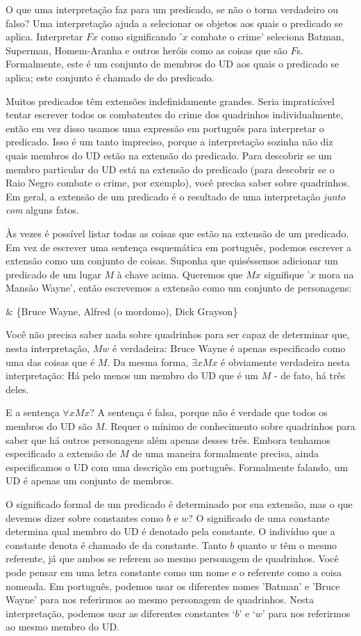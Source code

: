 O que uma interpretação faz para um predicado, se não o torna verdadeiro ou falso? Uma interpretação ajuda a selecionar os objetos aos quais o predicado se aplica. Interpretar $Fx$ como significando '$x$ combate o crime' seleciona Batman, Superman, Homem-Aranha e outros heróis como as coisas que são $F$s. Formalmente, este é um conjunto de membros do UD aos quais o predicado se aplica; este conjunto é chamado de  do predicado.

Muitos predicados têm extensões indefinidamente grandes. Seria impraticável tentar escrever todos os combatentes do crime dos quadrinhos individualmente, então em vez disso usamos uma expressão em português para interpretar o predicado. Isso é um tanto impreciso, porque a interpretação sozinha não diz quais membros do UD estão na extensão do predicado. Para descobrir se um membro particular do UD está na extensão do predicado (para descobrir se o Raio Negro combate o crime, por exemplo), você precisa saber sobre quadrinhos. Em geral, a extensão de um predicado é o resultado de uma interpretação \emph{junto com} alguns fatos.

Às vezes é possível listar todas as coisas que estão na extensão de um predicado. Em vez de escrever uma sentença esquemática em português, podemos escrever a extensão como um conjunto de coisas. Suponha que quiséssemos adicionar um predicado de um lugar $M$ à chave acima. Queremos que $Mx$ signifique '$x$ mora na Mansão Wayne', então escrevemos a extensão como um conjunto de personagens:
\begin{partialmodel}
	 & \{Bruce Wayne, Alfred (o mordomo), Dick Grayson\}
\end{partialmodel}
Você não precisa saber nada sobre quadrinhos para ser capaz de determinar que, nesta interpretação, $Mw$ é verdadeira: Bruce Wayne é apenas especificado como uma das coisas que é $M$. Da mesma forma, $\exists x Mx$ é obviamente verdadeira nesta interpretação: Há pelo menos um membro do UD que é um $M$ - de fato, há três deles.

E a sentença $\forall x  Mx$? A sentença é falsa, porque não é verdade que todos os membros do UD são $M$. Requer o mínimo de conhecimento sobre quadrinhos para saber que há outros personagens além apenas desses três. Embora tenhamos especificado a extensão de $M$ de uma maneira formalmente precisa, ainda especificamos o UD com uma descrição em português. Formalmente falando, um UD é apenas um conjunto de membros.

O significado formal de um predicado é determinado por sua extensão, mas o que devemos dizer sobre constantes como $b$ e $w$? O significado de uma constante determina qual membro do UD é denotado pela constante. O indivíduo que a constante denota é chamado de  da constante. Tanto $b$ quanto $w$ têm o mesmo referente, já que ambos se referem ao mesmo personagem de quadrinhos. Você pode pensar em uma letra constante como um nome e o referente como a coisa nomeada. Em português, podemos usar os diferentes nomes 'Batman' e 'Bruce Wayne' para nos referirmos ao mesmo personagem de quadrinhos. Nesta interpretação, podemos usar as diferentes constantes `$b$' e `$w$' para nos referirmos ao mesmo membro do UD.

